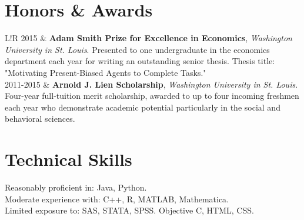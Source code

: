 \documentclass[10pt]{article}
\newcommand\VRule{\color{lightgray}\vrule width 0.5pt}
\begin{document}

\section*{Honors \& Awards}
\begin{tabular}{L!{\VRule}R}
2015 & \textbf{Adam Smith Prize for Excellence in Economics}, \emph{Washington University in St. Louis}.
\newline Presented to one undergraduate in the economics department each year for writing an outstanding senior thesis.  Thesis title: "Motivating Present-Biased Agents to Complete Tasks."
\\

2011-2015 & \textbf{Arnold J. Lien Scholarship}, \emph{Washington University in St. Louis}.
\newline Four-year full-tuition merit scholarship, awarded to up to four incoming freshmen each year who demonstrate academic potential particularly in the social and behavioral sciences.  
\\
\end{tabular}


\section*{Technical Skills}
Reasonably proficient in: Java, Python.  \\
Moderate experience with: C++, R, MATLAB, Mathematica. \\
Limited exposure to: SAS, STATA, SPSS.  Objective C, HTML, CSS.  

\end{document}
